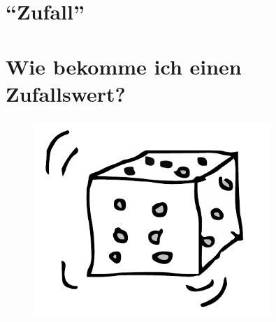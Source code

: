 



	\begin{center}
		\section*{\enquote{Zufall}}
		\section*{Wie bekomme ich einen Zufallswert?}	
	\end{center}
	
	\paragraph*{}
	\paragraph*{}
	\paragraph*{}
	
	\begin{figure}[htbp]
		\centering
		\includegraphics[width=0.8\textwidth]{img/zufall.pdf}
		\label{eingabe}
	\end{figure}
	
	
	\newpage
	
